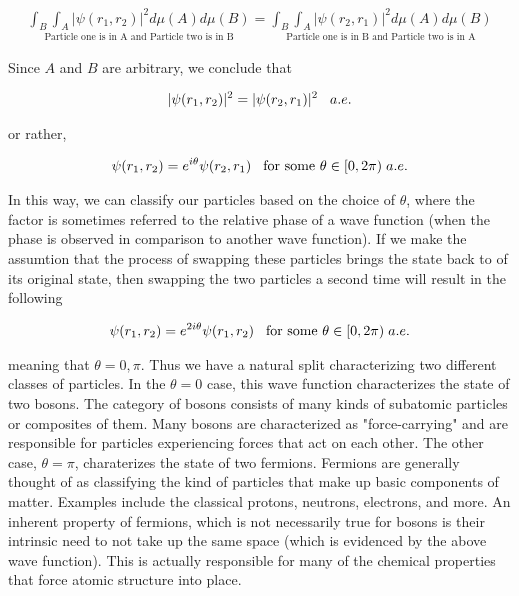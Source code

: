 \begin{equation}
	\begin{aligned}
		\underset{\text{Particle one is in A and Particle two is in B}}{\int_B \int_A |\psi(r_1,r_2)|^2 d\mu(A)d\mu(B)} = \underset{\text{Particle one is in B and Particle two is in A}}{\int_B \int_A |\psi(r_2,r_1)|^2 d\mu(A)d\mu(B)}
	\end{aligned}
\end{equation}

Since $A$ and $B$ are arbitrary, we conclude that 

\begin{equation}
	\begin{aligned}
		|\psi(r_1,r_2)|^2 = |\psi(r_2,r_1)|^2 \hspace{3mm}a.e.
	\end{aligned}
\end{equation}

or rather,

\begin{equation}
	\begin{aligned}
		\psi(r_1,r_2) = e^{i\theta} \psi(r_2,r_1) \hspace{3mm}\text{for some }\theta\in[0,2\pi) \hspace{1mm} a.e.
	\end{aligned}
\end{equation}

In this way, we can classify our particles based on the choice of $\theta$, where the factor is sometimes referred to the relative phase of a wave function (when the phase is observed in comparison to another wave function). If we make the assumtion that the process of swapping these particles brings the state back to of its original state, then swapping the two particles a second time will result in the following 

\begin{equation}
	\begin{aligned}
		\psi(r_1,r_2) = e^{2i\theta} \psi(r_1,r_2) \hspace{3mm}\text{for some }\theta\in[0,2\pi) \hspace{1mm} a.e.
	\end{aligned}
\end{equation}

meaning that $\theta = 0,\pi$. Thus we have a natural split characterizing two different classes of particles. In the $\theta=0$ case, this wave function characterizes the state of two bosons. The category of bosons consists of many kinds of subatomic particles or composites of them. Many bosons are characterized as "force-carrying" and are responsible for particles experiencing forces that act on each other. The other case, $\theta=\pi$, charaterizes the state of two fermions. Fermions are generally thought of as classifying the kind of particles that make up basic components of matter. Examples include the classical protons, neutrons, electrons, and more. An inherent property of fermions, which is not necessarily true for bosons is their intrinsic need to not take up the same space (which is evidenced by the above wave function). This is actually responsible for many of the chemical properties that force atomic structure into place.


